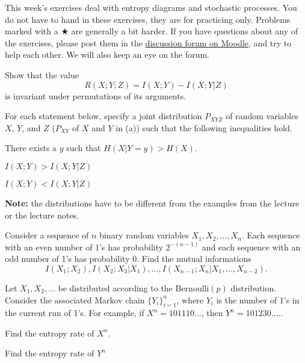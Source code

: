 \documentclass[a4paper,10pt,landscape,twocolumn]{scrartcl}
\begin{document}
\practiceproblems

{\sffamily\noindent
This week's exercises deal with entropy diagrams and stochastic processes. You do not have to hand in these exercises, they are for practicing only. Problems marked with a $\bigstar$ are generally a bit harder. If you have questions about any of the exercises, please post them in the \href{https://www.moodle.ch/lms/mod/forum/view.php?id=1761}{discussion forum on Moodle}, and try to help each other. We will also keep an eye on the forum.
}

\begin{exercise}
Show that the value
\[
R(X;Y;Z) = I(X;Y) - I(X;Y|Z)
\]
is invariant under permutations of its arguments.
\end{exercise}

\begin{exercise}[]
For each statement below, specify a joint distribution $P_{XYZ}$ of random variables $X$, $Y$, and $Z$ ($P_{XY}$ of $X$ and $Y$ in (a)) such that the following inequalities hold.
\begin{subex}
There exists a $y$ such that $H(X|Y=y) > H(X)$.
\end{subex}
\begin{subex}
$I(X;Y) > I(X;Y|Z)$
\end{subex}
\begin{subex}
$I(X;Y) < I(X;Y|Z)$
\end{subex}
\textbf{Note:} the distributions have to be different from the examples from the lecture or the lecture notes.
\end{exercise}

\begin{exercise}
Consider a sequence of $n$ binary random variables $X_1, X_2, ..., X_n$.
Each sequence with an even number of 1's has probability $2^{-(n-1)}$ and each sequence with an odd number
of 1's has probability 0. Find the mutual informations
\[
I(X_1;X_2), I(X_2;X_3|X_1), ..., I(X_{n-1};X_n|X_1, ..., X_{n-2}).
\]
\end{exercise}
\vspace{-0.5cm}
\begin{exercise}
Let $X_1, X_2, ...$ be distributed according to the Bernoulli$(p)$ distribution. Consider the associated Markov chain $\{Y_i\}_{i=1}^n$, where $Y_i$ is the number of 1's in the current run of 1's. For example, if $X^n = 101110...$, then $Y^n = 101230....$.
\begin{subex}
Find the entropy rate of $X^n$.
\end{subex}
\begin{subex}
Find the entropy rate of $Y^n$
\end{subex}
\end{exercise}
\end{document}
